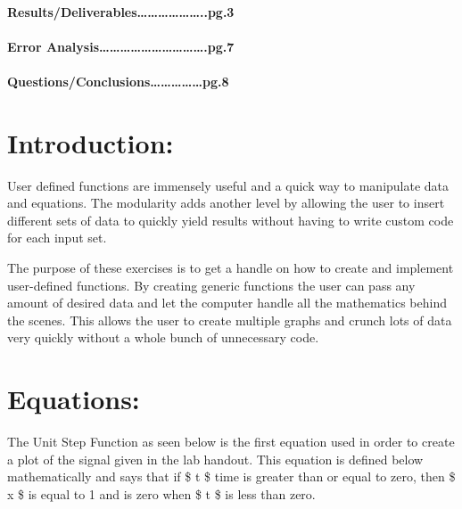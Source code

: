\documentclass[11pt]{article}
\begin{document}
\hypertarget{resultsdeliverables..pg.3}{%
\paragraph{Results/Deliverables\ldots{}\ldots{}\ldots{}\ldots{}\ldots{}\ldots{}..pg.3}\label{resultsdeliverables..pg.3}}

\hypertarget{error-analysis.pg.7}{%
\paragraph{Error
Analysis\ldots{}\ldots{}\ldots{}\ldots{}\ldots{}\ldots{}\ldots{}\ldots{}\ldots{}\ldots{}.pg.7}\label{error-analysis.pg.7}}

\hypertarget{questionsconclusionspg.8}{%
\paragraph{Questions/Conclusions\ldots{}\ldots{}\ldots{}\ldots{}\ldots{}pg.8}\label{questionsconclusionspg.8}}

    \hypertarget{introduction}{%
\section{Introduction:}\label{introduction}}

User defined functions are immensely useful and a quick way to
manipulate data and equations. The modularity adds another level by
allowing the user to insert different sets of data to quickly yield
results without having to write custom code for each input set.

The purpose of these exercises is to get a handle on how to create and
implement user-defined functions. By creating generic functions the user
can pass any amount of desired data and let the computer handle all the
mathematics behind the scenes. This allows the user to create multiple
graphs and crunch lots of data very quickly without a whole bunch of
unnecessary code.

    \hypertarget{equations}{%
\section{Equations:}\label{equations}}

The Unit Step Function as seen below is the first equation used in order
to create a plot of the signal given in the lab handout. This equation
is defined below mathematically and says that if \$ t \$ time is greater
than or equal to zero, then \$ x \$ is equal to 1 and is zero when \$ t
\$ is less than zero.
\end{document}
